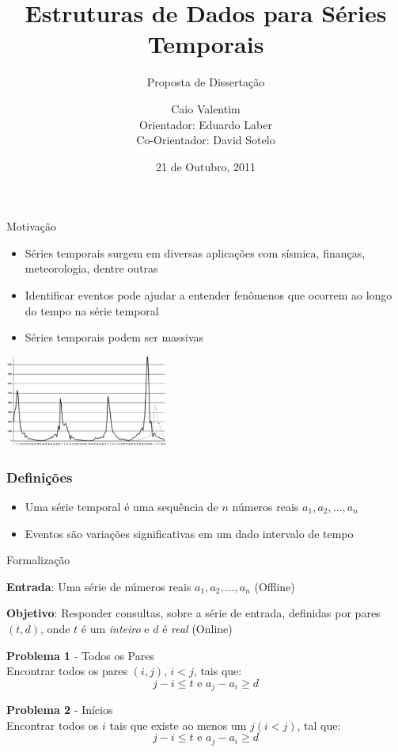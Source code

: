 \documentclass{beamer}
\title{Estruturas de Dados para Séries Temporais}
\subtitle{Proposta de Dissertação}
\author[C. Valentim]{
		Caio Valentim\\
		Orientador: Eduardo Laber	\\
		Co-Orientador: David Sotelo
}
\institute[PUC-Rio]{
		Departamento de Informática - DI \\
		Pontifícia Universidade Católica \\
		Rio de Janeiro, Brasil
}
\date{21 de Outubro, 2011}
\begin{document}
\nocite{*}
\begin{frame}[plain]
	\titlepage
\end{frame}

\begin{frame}{Motivação}
\begin{itemize}
  \item Séries temporais surgem em diversas aplicações com
				sísmica, finanças, meteorologia, dentre outras
  \item Identificar eventos pode ajudar a entender fenômenos que
				ocorrem ao longo do tempo na série temporal
  \item Séries temporais podem ser massivas	
\end{itemize}

\begin{center}
	\includegraphics[height=3.0cm]{temporal_serie_cropped.jpg}
\end{center}

\end{frame}

\begin{frame}
	\frametitle{Definições}
\begin{itemize}
  \item Uma série temporal é uma sequência de $n$ números reais
				$a_1, a_2, \ldots, a_n$
  \item Eventos são variações significativas em um dado intervalo
				 de tempo
\end{itemize}

\end{frame}


\begin{frame}{Formalização}

\textbf{Entrada}: Uma série de números reais $a_1, a_2, \ldots, a_n$ (Offline)
\medskip

\textbf{Objetivo}: Responder consultas, sobre a série de entrada, definidas por 
pares $(t, d)$, onde $t$ é um \textit{inteiro} e $d$ é \textit{real} (Online)
\bigskip

\textbf{Problema 1} - Todos os Pares
\\
Encontrar todos os pares $(i, j)$, $i<j$, tais que:
			$$ j - i \le t \text{ e } a_j - a_i \ge d $$

\textbf{Problema 2} - Inícios
\\
Encontrar todos os $i$ tais que existe ao menos um $j (i < j)$, tal que:
			$$ j - i \le t \text{ e } a_j - a_i \ge d $$

\end{frame}
\end{document}
